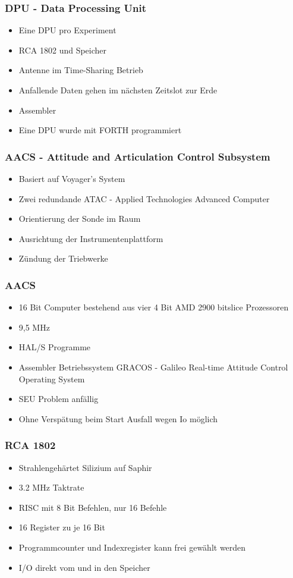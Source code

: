 \begin{frame}
	\frametitle{DPU - Data Processing Unit}
	\begin{itemize}
		\item Eine DPU pro Experiment
		\item RCA 1802 und Speicher
		\item Antenne im Time-Sharing Betrieb
		\item Anfallende Daten gehen im n\"achsten Zeitslot zur Erde
		\item Assembler
		\item Eine DPU wurde mit FORTH programmiert
	\end{itemize}
\end{frame}

\begin{frame}
	\frametitle{AACS - Attitude and Articulation Control Subsystem}
	\begin{itemize}
		\item Basiert auf Voyager's System
		\item Zwei redundande ATAC - Applied Technologies Advanced Computer
		\item Orientierung der Sonde im Raum
		\item Ausrichtung der Instrumentenplattform
		\item Z\"undung der Triebwerke
	\end{itemize}
\end{frame}

\begin{frame}
	\frametitle{AACS}
	\begin{itemize}
		\item 16 Bit Computer bestehend aus vier 4 Bit AMD 2900 bitslice Prozessoren
		\item 9,5 MHz
		\item HAL/S Programme
		\item Assembler Betriebssystem GRACOS - Galileo Real-time Attitude Control Operating System
		\item SEU Problem anf\"allig
		\item Ohne Versp\"atung beim Start Ausfall wegen Io m\"oglich
	\end{itemize}
\end{frame}

\begin{frame}
	\frametitle{RCA 1802}
	\begin{itemize}
		\item Strahlengeh\"artet Silizium auf Saphir
		\item 3.2 MHz Taktrate
		\item RISC mit 8 Bit Befehlen, nur 16 Befehle
		\item 16 Register zu je 16 Bit
		\item Programmcounter und Indexregister kann frei gew\"ahlt werden
		\item I/O direkt vom und in den Speicher
	\end{itemize}
\end{frame}


